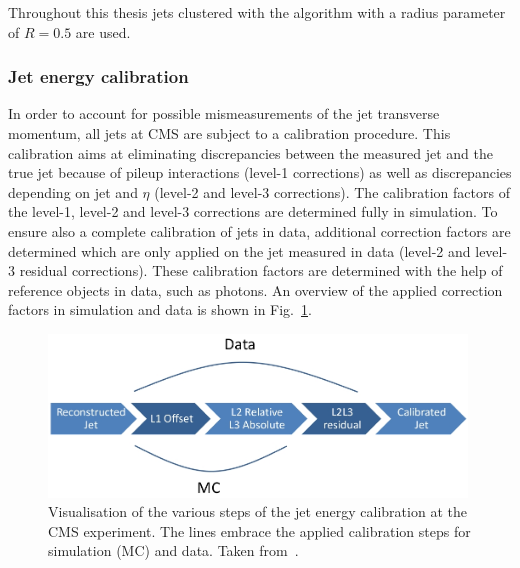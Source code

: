 Throughout this thesis jets clustered with the \antikt algorithm with a radius parameter of $R=0.5$ are used.

\subsubsection*{Jet energy calibration}
In order to account for possible mismeasurements of the jet transverse momentum, all jets at CMS are subject to a calibration procedure.
This calibration aims at eliminating discrepancies between the measured jet \pt and the true jet \pt because of pileup interactions (level-1 corrections) as well as discrepancies depending on jet \pt and $\eta$ (level-2 and level-3 corrections). 
The calibration factors of the level-1, level-2 and level-3 corrections are determined fully in simulation.
To ensure also a complete calibration of jets in data, additional correction factors are determined which are only applied on the jet \pt measured in data (level-2 and \mbox{level-3} residual corrections).
These calibration factors are determined with the help of reference objects in data, such as photons.
An overview of the applied correction factors in simulation and data is shown in Fig.~\ref{fig:JetEnergyCorrections}.
\begin{figure}[!b] 
  \centering
      \includegraphics[width=0.99\textwidth]{figures/experiment/ObjectReconstruction/JEC.jpg}
  \caption{Visualisation of the various steps of the jet energy calibration at the CMS experiment. The lines embrace the applied calibration steps for simulation (MC) and data. Taken from~\cite{bib:Kristin_Thesis}.}  
  \label{fig:JetEnergyCorrections}
\end{figure}


